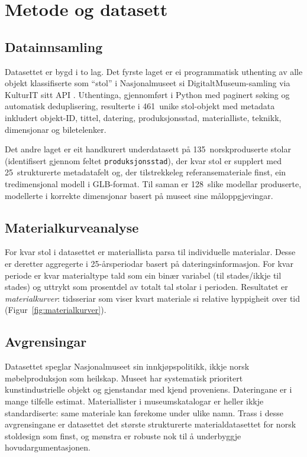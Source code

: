 \documentclass[12pt,a4paper]{article}
\begin{document}
\section{Metode og datasett}

\subsection{Datainnsamling}

Datasettet er bygd i to lag. Det fyrste laget er ei programmatisk uthenting av alle objekt klassifiserte som ``stol'' i Nasjonalmuseet si DigitaltMuseum-samling via KulturIT sitt API \citep{kulturit}. Uthentinga, gjennomf\o{}rt i Python med paginert s\o{}king og automatisk deduplisering, resulterte i 461~unike stol-objekt med metadata inkludert objekt-ID, tittel, datering, produksjonsstad, materialliste, teknikk, dimensjonar og biletelenker.

Det andre laget er eit handkurert underdatasett p\aa{} 135~norskproduserte stolar (identifisert gjennom feltet \texttt{produksjonsstad}), der kvar stol er supplert med 25~strukturerte metadatafelt og, der tilstrekkeleg referansemateriale finst, ein tredimensjonal modell i GLB-format. Til saman er 128~slike modellar produserte, modellerte i korrekte dimensjonar basert p\aa{} museet sine m\aa{}loppgjevingar.

\subsection{Materialkurveanalyse}

For kvar stol i datasettet er materiallista parsa til individuelle materialar. Desse er deretter aggregerte i 25-\aa{}rsperiodar basert p\aa{} dateringsinformasjon. For kvar periode er kvar materialtype tald som ein bin\ae{}r variabel (til stades/ikkje til stades) og uttrykt som prosentdel av totalt tal stolar i perioden. Resultatet er \emph{materialkurver}: tidsseriar som viser kvart materiale si relative hyppigheit over tid (Figur~\ref{fig:materialkurver}).

\subsection{Avgrensingar}

Datasettet speglar Nasjonalmuseet sin innkj\o{}pspolitikk, ikkje norsk m\o{}belproduksjon som heilskap. Museet har systematisk prioritert kunstindustrielle objekt og gjenstandar med kjend proveniens. Dateringane er i mange tilfelle estimat. Materiallister i museumskatalogar er heller ikkje standardiserte: same materiale kan f\o{}rekome under ulike namn. Trass i desse avgrensingane er datasettet det st\o{}rste strukturerte materialdatasettet for norsk stoldesign som finst, og m\o{}nstra er robuste nok til \aa{} underbyggje hovudargumentasjonen.
\end{document}
